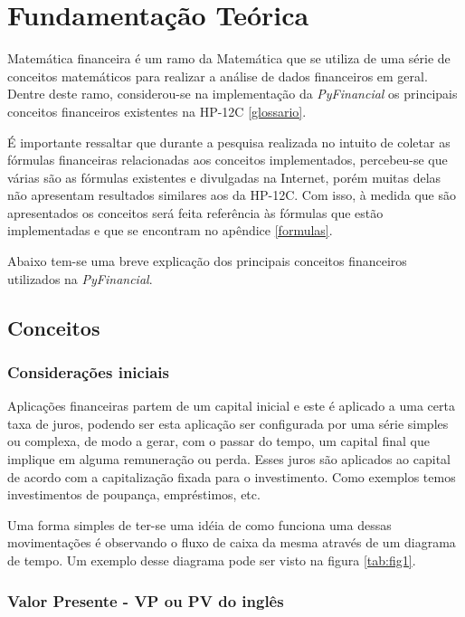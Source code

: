 \chapter{Fundamentação Teórica}

Matemática financeira é um ramo da Matemática que se utiliza de uma série de conceitos matemáticos para realizar a análise de dados financeiros em geral. Dentre deste ramo,  considerou-se na implementação da \textit{PyFinancial} os principais conceitos financeiros existentes na HP-12C \ref{glossario}.

É importante ressaltar que durante a pesquisa realizada no intuito de coletar as fórmulas financeiras relacionadas aos conceitos implementados, percebeu-se que várias são as fórmulas existentes e divulgadas na Internet, porém muitas delas não apresentam resultados similares aos da HP-12C. Com isso, à medida que são apresentados os conceitos será feita referência às fórmulas que estão implementadas e que se encontram no apêndice \ref{formulas}.

Abaixo tem-se uma breve explicação dos principais conceitos financeiros utilizados na \textit{PyFinancial}.

\section{Conceitos}

\subsection{Considerações iniciais}

Aplicações financeiras partem de um capital inicial e este é aplicado a uma certa taxa de juros, podendo ser esta aplicação ser configurada por uma série simples ou complexa, de modo a gerar, com o passar do tempo, um capital final que implique em alguma remuneração ou perda. Esses juros são aplicados ao capital de acordo com a capitalização fixada para o investimento. Como exemplos temos investimentos de poupança, empréstimos, etc.

Uma forma simples de ter-se uma idéia de como funciona uma dessas movimentações é observando o fluxo de caixa da mesma através de um diagrama de tempo. Um exemplo desse diagrama pode ser visto na figura \ref{tab:fig1}.

\subsection{Valor Presente - VP ou PV do inglês}

